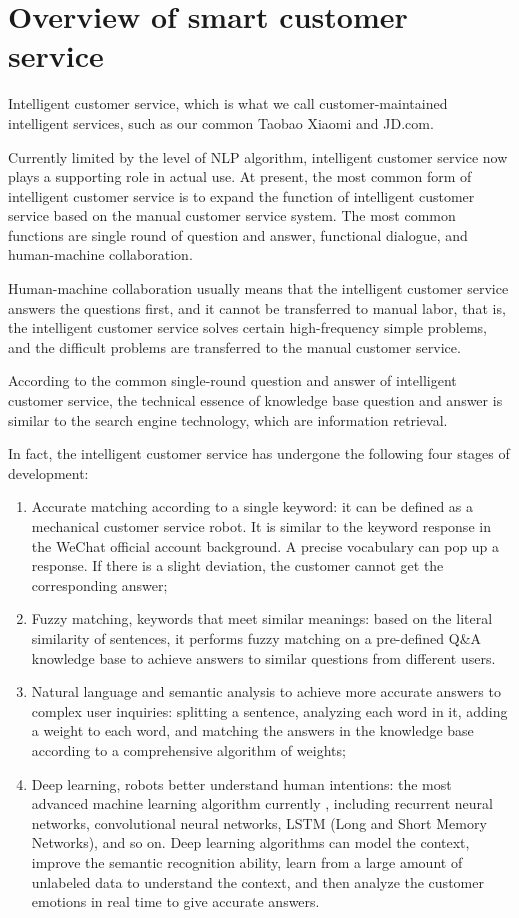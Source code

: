 \documentclass[11pt,en,number]{elegantpaper}
\begin{document}
\section{Overview of smart customer service}
	Intelligent customer service, which is what we call customer-maintained intelligent services, such as our common Taobao Xiaomi and JD.com.
	
	Currently limited by the level of NLP algorithm, intelligent customer service now plays a supporting role in actual use. At present, the most common form of intelligent customer service is to expand the function of intelligent customer service based on the manual customer service system. The most common functions are single round of question and answer, functional dialogue, and human-machine collaboration.
	
	Human-machine collaboration usually means that the intelligent customer service answers the questions first, and it cannot be transferred to manual labor, that is, the intelligent customer service solves certain high-frequency simple problems, and the difficult problems are transferred to the manual customer service.
	
	According to the common single-round question and answer of intelligent customer service, the technical essence of knowledge base question and answer is similar to the search engine technology, which are information retrieval\cite{6}.
	
	In fact, the intelligent customer service has undergone the following four stages of development:
	
    \begin{enumerate}
	  \item Accurate matching according to a single keyword: it can be defined as a mechanical customer service robot. It is similar to the keyword response in the WeChat official account background. A precise vocabulary can pop up a response. If there is a slight deviation, the customer cannot get the corresponding answer;
	  \item Fuzzy matching, keywords that meet similar meanings: based on the literal similarity of sentences, it performs fuzzy matching on a pre-defined Q\&A knowledge base to achieve answers to similar questions from different users. 
	  \item Natural language and semantic analysis to achieve more accurate answers to complex user inquiries: splitting a sentence, analyzing each word in it, adding a weight to each word, and matching the answers in the knowledge base according to a comprehensive algorithm of weights;
	  \item Deep learning, robots better understand human intentions: the most advanced machine learning algorithm currently , including recurrent neural networks, convolutional neural networks, LSTM (Long and Short Memory Networks), and so on. Deep learning algorithms can model the context, improve the semantic recognition ability, learn from a large amount of unlabeled data to understand the context, and then analyze the customer emotions in real time to give accurate answers. 
	\end{enumerate}
\end{document}
